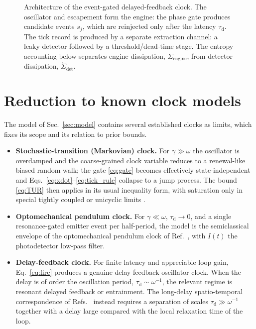 \documentclass[aps,pre,reprint,amsmath,amssymb,floatfix,nofootinbib]{revtex4-2}
\newcommand{\taud}{\tau_{\mathrm{d}}}
\begin{document}
\begin{figure}[t]
\begin{center}
\begin{tikzpicture}
\end{tikzpicture}
\end{center}
\caption{Architecture of the event-gated delayed-feedback clock. The
oscillator and escapement form the engine: the phase gate produces candidate
events $s_j$, which are reinjected only after the latency $\tau_{\mathrm d}$.
The tick record is produced by a separate extraction channel: a leaky detector
followed by a threshold/dead-time stage. The entropy accounting below separates
engine dissipation, $\dot\Sigma_{\mathrm{engine}}$, from detector dissipation,
$\dot\Sigma_{\mathrm{det}}$.}
\label{fig:architecture}
\end{figure}

\section{Reduction to known clock models}
\label{sec:limits}

The model of Sec.~\ref{sec:model} contains several established clocks as
limits, which fixes its scope and its relation to prior bounds.

\begin{itemize}
\item \textbf{Stochastic-transition (Markovian) clock.}
For $\gamma \gg \omega$ the oscillator is overdamped and the coarse-grained
clock variable reduces to a renewal-like biased random walk; the gate
\eqref{eq:gate} becomes effectively state-independent and
Eqs.~\eqref{eq:xdot}--\eqref{eq:tick_rule} collapse to a jump process.
The bound \eqref{eq:TUR} then applies in its usual inequality form,
with saturation only in special tightly coupled or unicyclic limits
\cite{BaratoSeifert2016,Erker2017,Meier2023}.

\item \textbf{Optomechanical pendulum clock.}
For $\gamma \ll \omega$, $\taud \to 0$, and a single resonance-gated
emitter event per half-period, the model is the semiclassical envelope of
the optomechanical pendulum clock of Ref.~\cite{Brunelli2026}, with
$I(t)$ the photodetector low-pass filter.

\item \textbf{Delay-feedback clock.}
For finite latency and appreciable loop gain, Eq.~\eqref{eq:fire}
produces a genuine delay-feedback oscillator clock. When the delay is of
order the oscillation period, $\taud \sim \omega^{-1}$, the relevant
regime is resonant delayed feedback or entrainment. The long-delay
spatio-temporal correspondence of
Refs.~\cite{GiacomelliPoliti1996,YanchukGiacomelli2017} instead requires a
separation of scales $\taud \gg \omega^{-1}$ together with a delay large
compared with the local relaxation time of the loop.
\end{itemize}
\end{document}

